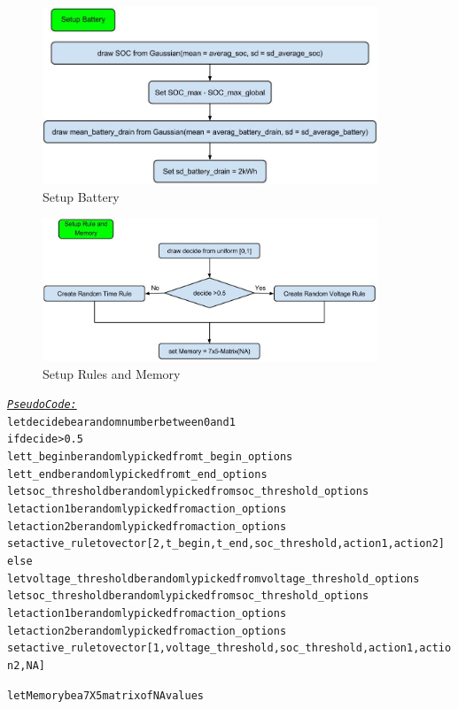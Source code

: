 \documentclass[a4paper]{article}
\begin{document}
\begin{figure}[!ht]
\centering
\includegraphics[width =10cm]{setup_battery.jpg}
\caption{Setup Battery}
\label{setup_battery}
\end{figure}

\begin{figure}[!ht]
\centering
\includegraphics[width =10cm]{setup_rule_memory.jpg}
\caption{Setup Rules and Memory}
\label{setup_rule_memory}
\end{figure}

\begin{alltt}
 \underline{\textit{Pseudo Code:}}
let decide be a random number between 0 and 1
if decide > 0.5 
    let t\_begin be randomly picked from t_begin_options
    let t\_end be randomly picked from t_end_options
    let soc\_threshold be randomly picked from soc\_threshold_options
    let action1 be randomly picked from action\_options
    let action2 be randomly picked from action\_options
    set active\_rule to vector[2,t\_begin,t\_end,soc\_threshold,action1,action2]
else
    let voltage_threshold be randomly picked from voltage_threshold_options
    let soc_threshold be randomly picked from soc_threshold_options
    let action1 be randomly picked from action_options
    let action2 be randomly picked from action_options
    set active_rule to vector[1,voltage_threshold,soc_threshold,action1,action2,NA]

let Memory be a 7X5 matrix of NA values
\end{alltt}
\newpage
\end{document}
